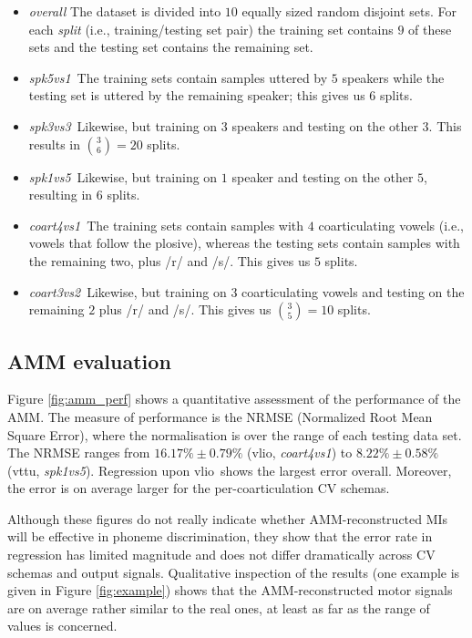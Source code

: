 \documentclass[10pt]{article}
\newcommand{\vlio}{\textsf{vlio}}
\newcommand{\vttu}{\textsf{vttu}}
\newcommand{\spka}{\emph{spk5vs1}}
\newcommand{\spkb}{\emph{spk3vs3}}
\newcommand{\spkc}{\emph{spk1vs5}}
\newcommand{\coa}{\emph{coart4vs1}}
\newcommand{\cob}{\emph{coart3vs2}}
\begin{document}
\begin{itemize}

 \item \emph{overall} The dataset is divided into $10$ equally sized random disjoint sets.
	For each \emph{split} (i.e., training/testing set pair) the training set contains $9$
	of these sets and the testing set contains the remaining set.

  \item \spka\ The training sets contain samples
  	uttered by $5$ speakers while the testing set is
  	uttered by the remaining speaker; this gives us $6$ splits.

  \item \spkb\ Likewise, but training on $3$ speakers and testing on the
  	other $3$. This results in $\binom{3}{6} = 20$ splits.

  \item \spkc\ Likewise, but training on $1$ speaker and testing on the
  	other $5$, resulting in $6$ splits.

  \item \coa\ The training sets contain samples
  	with $4$ coarticulating vowels (i.e., vowels that follow the plosive), whereas the testing sets contain samples
  	with the remaining two, plus /r/ and /s/. This gives us $5$ splits.

  \item \cob\ Likewise, but training on $3$ coarticulating vowels and
  	testing on the remaining $2$ plus /r/ and /s/. This gives us
  	$\binom{3}{5} = 10$ splits.

\end{itemize}



\subsection*{AMM evaluation}
\label{subsec:amm_results}

Figure \ref{fig:amm_perf} shows a quantitative assessment of the performance
of the AMM. The measure of performance is the NRMSE (Normalized Root Mean Square Error),
where the normalisation is over the range of each testing data set. The NRMSE
ranges from $16.17\% \pm 0.79\%$ (\vlio, \coa) to $8.22\% \pm 0.58\%$ (\vttu, \spkc).
Regression upon \vlio\ shows the largest error overall. Moreover, the error is on average
larger for the per-coarticulation CV schemas.

Although these figures do not really indicate whether AMM-reconstructed MIs will be
effective in phoneme discrimination, they show that the error rate in regression has
limited magnitude and does not differ dramatically across CV schemas and output signals.
Qualitative inspection of the results (one example is given in Figure \ref{fig:example})
shows that the AMM-reconstructed motor signals are on average rather
similar to the real ones, at least as far as the range of values is concerned.
\end{document}
